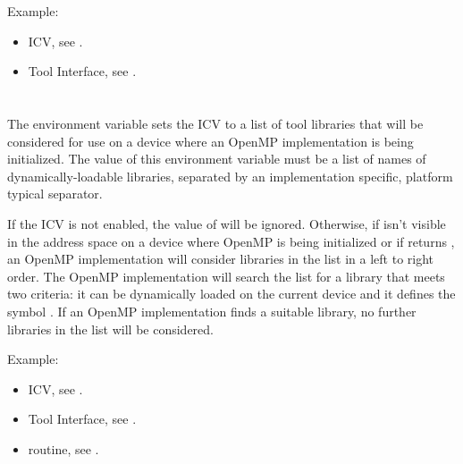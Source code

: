 Example:
\begin{ompEnv}
\end{ompEnv}

\crossreferences
\begin{itemize}
\item {} ICV, see .
\item Tool Interface, see .
\end{itemize}




\section{}
\label{sec:OMP_TOOL_LIBRARIES}

The  environment variable sets the
 ICV to a list of tool libraries that will
be considered for use on a device where an OpenMP implementation
is being initialized. The value of this environment variable must 
be a list of names of dynamically-loadable libraries, separated 
by an implementation specific, platform typical separator.

If the  ICV is not enabled,
the value of  will be ignored.
Otherwise, if  
isn't visible in the address space on a device where OpenMP is being
initialized or if  returns , an OpenMP implementation
will consider libraries in the  list
in a left to right order.  The OpenMP implementation will search the list for
a library that meets two criteria: it can be dynamically
loaded on the current device and it defines the symbol .
If an OpenMP implementation finds a suitable library,
no further libraries in the list will be considered.

Example:
\begin{ompEnv}
\end{ompEnv}

\crossreferences
\begin{itemize}
\item {} ICV, see .
\item Tool Interface, see .
\item {} routine, see .
\end{itemize}

